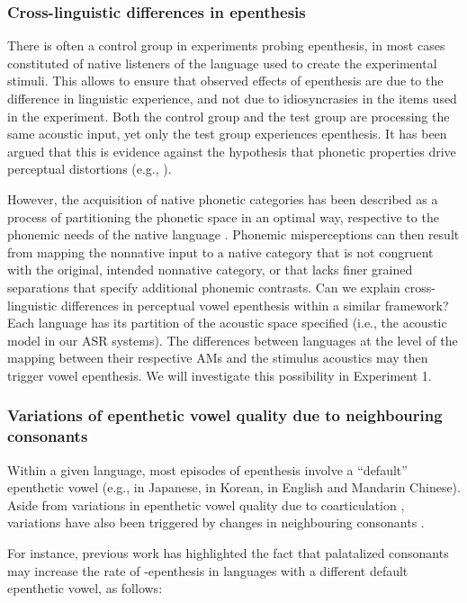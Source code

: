 {\subsubsection{Cross-linguistic differences in epenthesis}
There is often a control group in experiments probing epenthesis, in most cases constituted of native listeners of the language used to create the experimental stimuli. This allows to ensure that observed effects of epenthesis are due to the difference in linguistic experience, and not due to idiosyncrasies in the items used in the experiment. 
Both the control group and the test group are processing the same acoustic input, yet only the test group experiences epenthesis. It has been argued that this is evidence against the hypothesis that phonetic properties drive perceptual distortions (e.g., \cite{berent2007}).

However, the acquisition of native phonetic categories has been described as a process of partitioning the phonetic space in an optimal way, respective to the phonemic needs of the native language \cite{kuhl1995, best1995}. Phonemic misperceptions can then result from mapping the nonnative input to a native category that is not congruent with the original, intended nonnative category, or that lacks finer grained separations that specify additional phonemic contrasts.    
Can we explain cross-linguistic differences in perceptual vowel epenthesis within a similar framework? Each language has its partition of the acoustic space specified (i.e., the acoustic model in our ASR systems). The differences between languages at the level of the mapping between their respective AMs and the stimulus acoustics may then trigger vowel epenthesis. We will investigate this possibility in Experiment 1. 
 
\subsubsection{Variations of epenthetic vowel quality due to neighbouring consonants} 
Within a given language, most episodes of epenthesis involve a ``default'' epenthetic vowel (e.g., \textipa{[W]} in Japanese, \textipa{[1]} in Korean, \textipa{[@]} in English and Mandarin Chinese). Aside from variations in epenthetic vowel quality due to coarticulation \cite{dupoux2011, guekozIS17, guekozJASA17}, variations have also been triggered by changes in neighbouring consonants \cite{mattingley2015, durvasula2015, durvasula2018}.

For instance, previous work has highlighted the fact that palatalized consonants may increase the rate of -epenthesis in languages with a different default epenthetic vowel, as follows:

}
